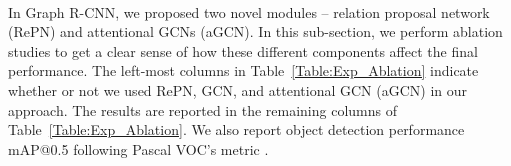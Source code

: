 \begin{table}[t]\footnotesize
\setlength{\tabcolsep}{1.8pt}
\centering
{}\\[5pt]
\caption{Ablation studies on Graph R-CNN. We report the performance based on four scene graph generation metrics and the object detection performance in mAP@0.5.}
\label{Table:Exp_Ablation}
\end{table}

In Graph R-CNN, we proposed two novel modules -- relation proposal network (RePN) and attentional GCNs (aGCN). In this sub-section, we perform ablation studies to get a clear sense of how these different components affect the final performance. The left-most columns in Table~\ref{Table:Exp_Ablation} indicate whether or not we used RePN, GCN, and attentional GCN (aGCN) in our approach. 
The results are reported in the remaining columns of Table~\ref{Table:Exp_Ablation}. We also report object detection performance mAP@0.5 following Pascal VOC's metric \cite{everingham2012pascal}.

